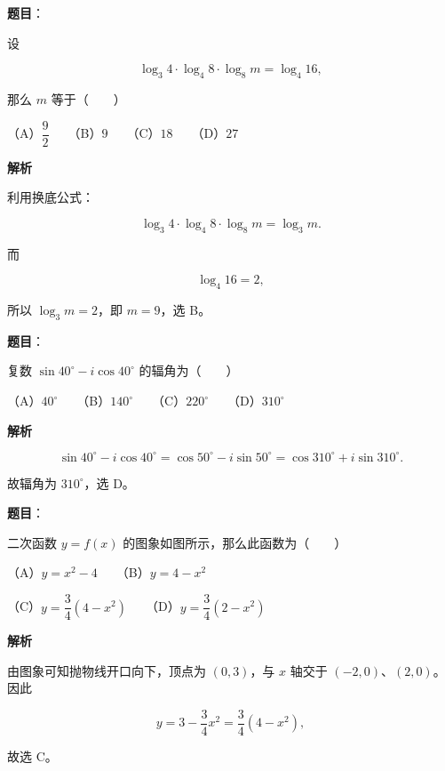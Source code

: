 \begin{answer}

\textbf{题目}：

设

\nopagebreak[4]
\[
\log_3 4\cdot\log_4 8\cdot\log_8m=\log_4 16,
\]

那么 $m$ 等于\mbox{（　　）}

（A）$\dfrac92$　　（B）$9$　　（C）$18$　　（D）$27$

\textbf{解析}

利用换底公式：

\nopagebreak[4]
\[
\log_3 4\cdot\log_4 8\cdot\log_8m
=\log_3m.
\]

而

\nopagebreak[4]
\[
\log_4 16=2,
\]

所以 $\log_3m=2$，即 $m=9$，选 B。


\end{answer}
\begin{answer}

\textbf{题目}：

复数 $\sin40^\circ-i\cos40^\circ$ 的辐角为\mbox{（　　）}

（A）$40^\circ$　　（B）$140^\circ$　　（C）$220^\circ$　　（D）$310^\circ$

\textbf{解析}

\nopagebreak[4]
\[
\sin40^\circ-i\cos40^\circ
=\cos50^\circ-i\sin50^\circ
=\cos310^\circ+i\sin310^\circ.
\]

故辐角为 $310^\circ$，选 D。


\end{answer}
\begin{answer}

\textbf{题目}：

二次函数 $y=f(x)$ 的图象如图所示，那么此函数为\mbox{（　　）}
\nopagebreak[4]
\begin{center}\end{center}
\nopagebreak[4]
（A）$y=x^2-4$　　（B）$y=4-x^2$

（C）$y=\dfrac34(4-x^2)$　　（D）$y=\dfrac34(2-x^2)$

\textbf{解析}

由图象可知抛物线开口向下，顶点为 $(0,3)$，与 $x$ 轴交于 $(-2,0)$、$(2,0)$。因此

\nopagebreak[4]
\[
y=3-\frac34x^2=\frac34(4-x^2),
\]

故选 C。


\end{answer}
